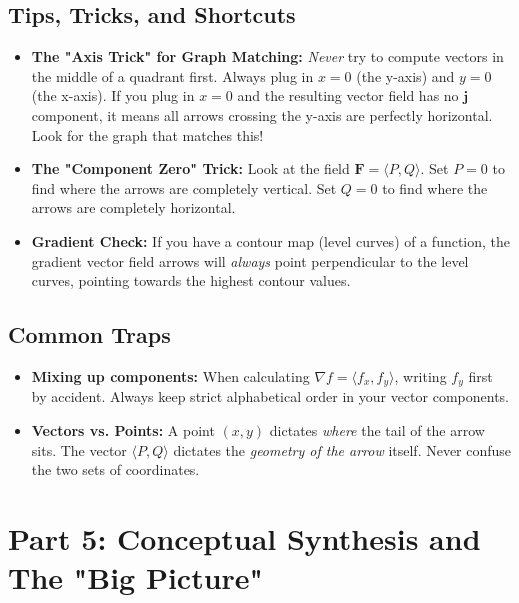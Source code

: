\documentclass[11pt]{article}
\begin{document}
\subsection{Tips, Tricks, and Shortcuts}
\begin{itemize}
    \item \textbf{The "Axis Trick" for Graph Matching:} \textit{Never} try to compute vectors in the middle of a quadrant first. Always plug in $x=0$ (the y-axis) and $y=0$ (the x-axis). If you plug in $x=0$ and the resulting vector field has no $\mathbf{j}$ component, it means all arrows crossing the y-axis are perfectly horizontal. Look for the graph that matches this!
    \item \textbf{The "Component Zero" Trick:} Look at the field $\mathbf{F} = \langle P, Q \rangle$. Set $P = 0$ to find where the arrows are completely vertical. Set $Q = 0$ to find where the arrows are completely horizontal. 
    \item \textbf{Gradient Check:} If you have a contour map (level curves) of a function, the gradient vector field arrows will \textit{always} point perpendicular to the level curves, pointing towards the highest contour values.
\end{itemize}

\subsection{Common Traps}
\begin{itemize}
    \item \textbf{Mixing up components:} When calculating $\nabla f = \langle f_x, f_y \rangle$, writing $f_y$ first by accident. Always keep strict alphabetical order in your vector components.
    \item \textbf{Vectors vs. Points:} A point $(x,y)$ dictates \textit{where} the tail of the arrow sits. The vector $\langle P, Q \rangle$ dictates the \textit{geometry of the arrow} itself. Never confuse the two sets of coordinates.
\end{itemize}

\section{Part 5: Conceptual Synthesis and The "Big Picture"}
\end{document}
